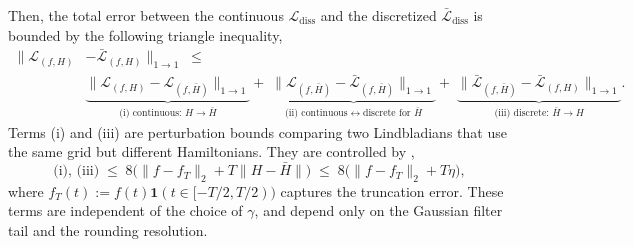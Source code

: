 Then, the total error between the continuous $\mathcal{L}_\text{diss}$ and the discretized $\mathcal{\bar{L}}_\text{diss}$ is bounded by the following triangle inequality,
\begin{equation} \label{eq:main-lindbladian-tri-ineq-discr}
    \begin{split}
    \|\mathcal{L}_{(f,H)} &- \bar{\mathcal{L}}_{(f,H)}\|_{1 \to 1}
\;\leq\; \\
&\underbrace{\|\mathcal{L}_{(f,H)} - \mathcal{L}_{(f,\bar{H})}\|_{1 \to 1}}_{\text{(i) continuous: }H \to \bar{H}}
+\;
\underbrace{\|\mathcal{L}_{(f,\bar{H})} - \bar{\mathcal{L}}_{(f,\bar{H})}\|_{1 \to 1}}_{\text{(ii) continuous} \leftrightarrow \text{discrete for }\bar{H}}
+\;
\underbrace{\|\bar{\mathcal{L}}_{(f,\bar{H})} - \bar{\mathcal{L}}_{(f,H)}\|_{1 \to 1}}_{\text{(iii) discrete: }\bar{H} \to H}.
\end{split}
\end{equation}
Terms (i) and (iii) are perturbation bounds comparing two Lindbladians that use the same grid but different Hamiltonians. They are controlled by \cite[Corollary A.1, A.2]{chen2023quantum},
\begin{equation}
    \text{(i), (iii)} \;\leq\; 
8\big(\|f - f_T\|_2 + T\|H - \bar{H}\|\big) 
\;\leq\; 8\big(\|f - f_T\|_2 + T\eta\big),
\end{equation}
where $f_T(t) := f(t) \mathbf{1}(t \in [-T/2, T/2))$ captures the truncation error. These terms are independent of the choice of $\gamma$, and depend only on the Gaussian filter tail and the rounding resolution.

